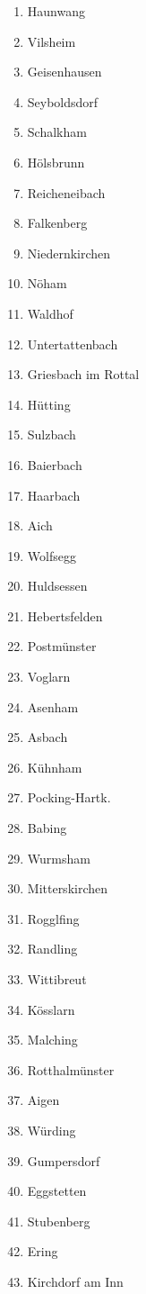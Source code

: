\begin{multicols}{3}
\begin{enumerate}
\item Haunwang
\item Vilsheim
\item Geisenhausen
\item Seyboldsdorf
\item Schalkham
\item Hölsbrunn
\item Reicheneibach
\item Falkenberg
\item Niedernkirchen
\item Nöham
\item Waldhof
\item Untertattenbach
\item Griesbach im Rottal
\item Hütting
\item Sulzbach
\item Baierbach
\item Haarbach
\item Aich
\item Wolfsegg
\item Huldsessen
\item Hebertsfelden
\item Postmünster
\item Voglarn
\item Asenham
\item Asbach
\item Kühnham
\item Pocking-Hartk.
\item Babing
\item Wurmsham
\item Mitterskirchen
\item Rogglfing
\item Randling
\item Wittibreut
\item Kösslarn
\item Malching
\item Rotthalmünster
\item Aigen
\item Würding
\item Gumpersdorf
\item Eggstetten
\item Stubenberg
\item Ering
\item Kirchdorf am Inn
\end{enumerate}
\end{multicols}


